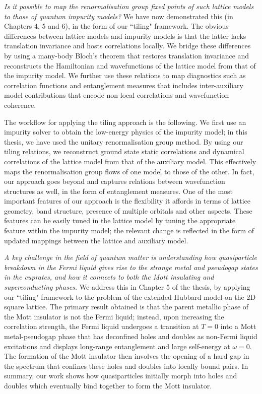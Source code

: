 {\it Is it possible to map the renormalisation group fixed points of such lattice models to those of quantum impurity models?} We have now demonstrated this (in Chapters 4, 5 and 6), in the form of our ``tiling" framework. The obvious differences between lattice models and impurity models is that the latter lacks translation invariance and hosts correlations locally. We bridge these differences by using a many-body Bloch's theorem that restores translation invariance and reconstructs the Hamiltonian and wavefunctions of the lattice model from that of the impurity model. We further use these relations to map diagnostics such as correlation functions and entanglement measures that includes inter-auxiliary model contributions that encode non-local correlations and wavefunction coherence. 

The workflow for applying the tiling approach is the following. We first use an impurity solver to obtain the low-energy physics of the impurity model; in this thesis, we have used the unitary renormalisation group method. By using our tiling relations, we reconstruct ground state static correlations and dynamical correlations of the lattice model from that of the auxiliary model. This effectively maps the renormalisation group flows of one model to those of the other. In fact, our approach goes beyond and captures relations between wavefunction structures as well, in the form of entanglement measures. One of the most important features of our approach is the flexibility it affords in terms of lattice geometry, band structure, presence of multiple orbitals and other aspects. These features can be easily tuned in the lattice model by tuning the appropriate feature within the impurity model; the relevant change is reflected in the form of updated mappings between the lattice and auxiliary model.

{\it A key challenge in the field of quantum matter is understanding how quasiparticle breakdown in the Fermi liquid gives rise to the strange metal and pseudogap states in the cuprates, and how it connects to both the Mott insulating and superconducting phases.} We address this in Chapter 5 of the thesis, by applying our ``tiling" framework to the problem of the extended Hubbard model on the 2D square lattice. The primary result obtained is that the parent metallic phase of the Mott insulator is not the Fermi liquid; instead, upon increasing the correlation strength, the Fermi liquid undergoes a transition at \(T=0\) into a Mott metal-pseudogap phase that has deconfined holes and doubles as non-Fermi liquid excitations and displays long-range entanglement and large self-energy at \(\omega=0\). The formation of the Mott insulator then involves the opening of a hard gap in the spectrum that confines these holes and doubles into locally bound pairs. In summary, our work shows how quasiparticles initially morph into holes and doubles which eventually bind together to form the Mott insulator. 

